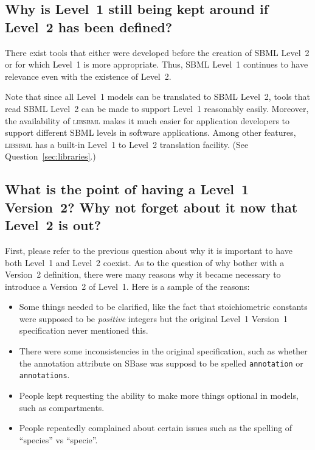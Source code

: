 \documentclass{sbmlfaq}
\begin{document}
\subsection{Why is Level~1 still being kept around if Level~2 has been defined?}
\label{sec:why-keep-level-1}

There exist tools that either were developed before the creation of SBML
Level~2 or for which Level~1 is more appropriate.  Thus, SBML Level~1
continues to have relevance even with the existence of Level~2.  

Note that since all Level~1 models can be translated to SBML Level~2, tools
that read SBML Level~2 can be made to support Level~1 reasonably easily.
Moreover, the availability of \textsc{libsbml} makes it much easier for
application developers to support different SBML levels in software
applications.  Among other features, \textsc{libsbml} has a built-in
Level~1 to Level~2 translation facility.  (See
Question~\ref{sec:libraries}.)


\subsection{What is the point of having a Level~1 Version~2?  Why not
  forget about it now that Level~2 is out?}

First, please refer to the previous question about why it is important to
have both Level~1 and Level~2 coexist.  As to the question of why bother
with a Version~2 definition, there were many reasons why it became
necessary to introduce a Version~2 of Level~1.  Here is a sample of the
reasons:
\begin{itemize}
  
\item Some things needed to be clarified, like the fact that stoichiometric
  constants were supposed to be \emph{positive} integers but the original
  Level~1 Version~1 specification never mentioned this.
  
\item There were some inconsistencies in the original specification, such
  as whether the annotation attribute on SBase was supposd to be spelled
  \texttt{annotation} or \texttt{annotations}.
  
\item People kept requesting the ability to make more things optional in
  models, such as compartments.
  
\item People repeatedly complained about certain issues such as the
  spelling of ``species'' vs ``specie''.

\end{itemize}
\end{document}

